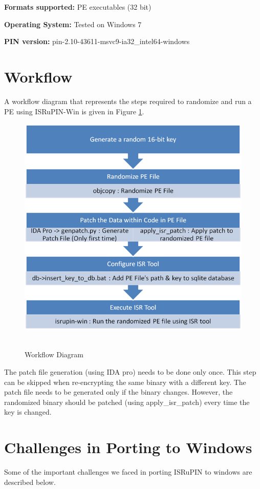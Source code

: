 \documentclass[a4paper,12pt]{llncs}
\begin{document}
\textbf{Formats supported:} PE executables (32 bit)

\textbf{Operating System:} Tested on Windows 7

\textbf{PIN version:} pin-2.10-43611-msvc9-ia32\_intel64-windows

\pagebreak

\section{Workflow}
\label{sec:workflow}
A workflow diagram that represents the steps required to randomize and run a PE using ISRuPIN-Win is given in Figure \ref{fig:workflow}.
\begin{figure}[!ht]
\centering
\includegraphics[scale=0.57]{workflow.png}\
\caption{Workflow Diagram}
\label{fig:workflow}
\end{figure}

The patch file generation (using IDA pro) needs to be done only once. This step can be skipped when re-encrypting the same binary with a different key. The patch file needs to be generated only if the binary changes. However, the randomized binary should be patched (using apply\_isr\_patch) every time the key is changed.

\pagebreak

\section{Challenges in Porting to Windows}
\label{sec:challenges}
Some of the important challenges we faced in porting ISRuPIN to windows are described below.
\end{document}
